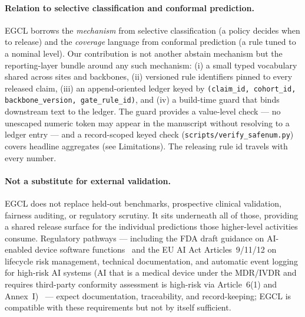 \documentclass{article}
\begin{document}
\paragraph{Relation to selective classification and conformal prediction.} EGCL borrows the \emph{mechanism} from selective classification (a policy decides when to release) and the \emph{coverage} language from conformal prediction (a rule tuned to a nominal level). Our contribution is not another abstain mechanism but the reporting-layer bundle around any such mechanism: (i) a small typed vocabulary shared across sites and backbones, (ii) versioned rule identifiers pinned to every released claim, (iii) an append-oriented ledger keyed by \texttt{(claim\_id, cohort\_id, backbone\_version, gate\_rule\_id)}, and (iv) a build-time guard that binds downstream text to the ledger. The guard provides a value-level check --- no unescaped numeric token may appear in the manuscript without resolving to a ledger entry --- and a record-scoped keyed check (\texttt{scripts/verify\_safenum.py}) covers headline aggregates (see Limitations). The releasing rule id travels with every number.

\paragraph{Not a substitute for external validation.} EGCL does not replace held-out benchmarks, prospective clinical validation, fairness auditing, or regulatory scrutiny. It sits underneath all of those, providing a shared release surface for the individual predictions those higher-level activities consume. Regulatory pathways --- including the FDA draft guidance on AI-enabled device software functions~\citep{fdaguidance2025} and the EU AI Act Articles~9/11/12 on lifecycle risk management, technical documentation, and automatic event logging for high-risk AI systems (AI that is a medical device under the MDR/IVDR and requires third-party conformity assessment is high-risk via Article~6(1) and Annex~I)~\citep{euaiact2024} --- expect documentation, traceability, and record-keeping; EGCL is compatible with these requirements but not by itself sufficient.
\end{document}
